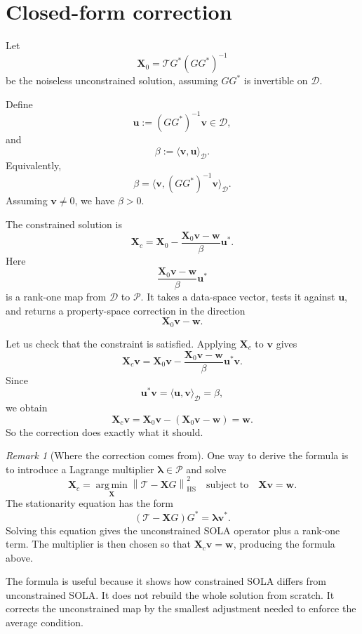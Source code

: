 \documentclass[11pt,openany]{book}
\theoremstyle{definition}
\theoremstyle{remark}
\newtheorem{remark}{Remark}[chapter]
\newcommand{\D}{\mathcal D}
\newcommand{\Pspace}{\mathcal P}
\newcommand{\Tau}{\mathcal{T}}
\newcommand{\HS}{\mathrm{HS}}
\newcommand{\argmin}{\operatorname*{arg\,min}}
\begin{document}
\section{Closed-form correction}

Let
\[
  \mathbf X_0
  =
  \Tau G^*(GG^*)^{-1}
\]
be the noiseless unconstrained solution, assuming \(GG^*\) is invertible on \(\D\).

Define
\[
  \mathbf u
  :=
  (GG^*)^{-1}\mathbf v
  \in\D,
\]
and
\[
  \beta
  :=
  \langle \mathbf v,\mathbf u\rangle_{\D}.
\]
Equivalently,
\[
  \beta
  =
  \langle \mathbf v,(GG^*)^{-1}\mathbf v\rangle_{\D}.
\]
Assuming \(\mathbf v\neq 0\), we have \(\beta>0\).

The constrained solution is
\[
  \mathbf X_c
  =
  \mathbf X_0
  -
  \frac{\mathbf X_0\mathbf v-\mathbf w}{\beta}
  \mathbf u^*.
\]
Here
\[
  \frac{\mathbf X_0\mathbf v-\mathbf w}{\beta}
  \mathbf u^*
\]
is a rank-one map from \(\D\) to \(\Pspace\). It takes a data-space vector, tests it against
\(\mathbf u\), and returns a property-space correction in the direction
\[
  \mathbf X_0\mathbf v-\mathbf w.
\]

Let us check that the constraint is satisfied. Applying \(\mathbf X_c\) to \(\mathbf v\) gives
\[
  \mathbf X_c\mathbf v
  =
  \mathbf X_0\mathbf v
  -
  \frac{\mathbf X_0\mathbf v-\mathbf w}{\beta}
  \mathbf u^*\mathbf v.
\]
Since
\[
  \mathbf u^*\mathbf v
  =
  \langle \mathbf u,\mathbf v\rangle_{\D}
  =
  \beta,
\]
we obtain
\[
  \mathbf X_c\mathbf v
  =
  \mathbf X_0\mathbf v
  -
  (\mathbf X_0\mathbf v-\mathbf w)
  =
  \mathbf w.
\]
So the correction does exactly what it should.

\begin{remark}[Where the correction comes from]
One way to derive the formula is to introduce a Lagrange multiplier
\(\boldsymbol\lambda\in\Pspace\) and solve
\[
  \mathbf X_c
  =
  \argmin_{\mathbf X}
  \left\|
    \Tau-\mathbf XG
  \right\|_{\HS}^2
  \quad
  \text{subject to}
  \quad
  \mathbf X\mathbf v=\mathbf w.
\]
The stationarity equation has the form
\[
  (\Tau-\mathbf XG)G^*
  =
  \boldsymbol\lambda\mathbf v^*.
\]
Solving this equation gives the unconstrained SOLA operator plus a rank-one term. The multiplier
is then chosen so that \(\mathbf X_c\mathbf v=\mathbf w\), producing the formula above.
\end{remark}

The formula is useful because it shows how constrained SOLA differs from unconstrained SOLA.
It does not rebuild the whole solution from scratch. It corrects the unconstrained map by the
smallest adjustment needed to enforce the average condition.
\end{document}
